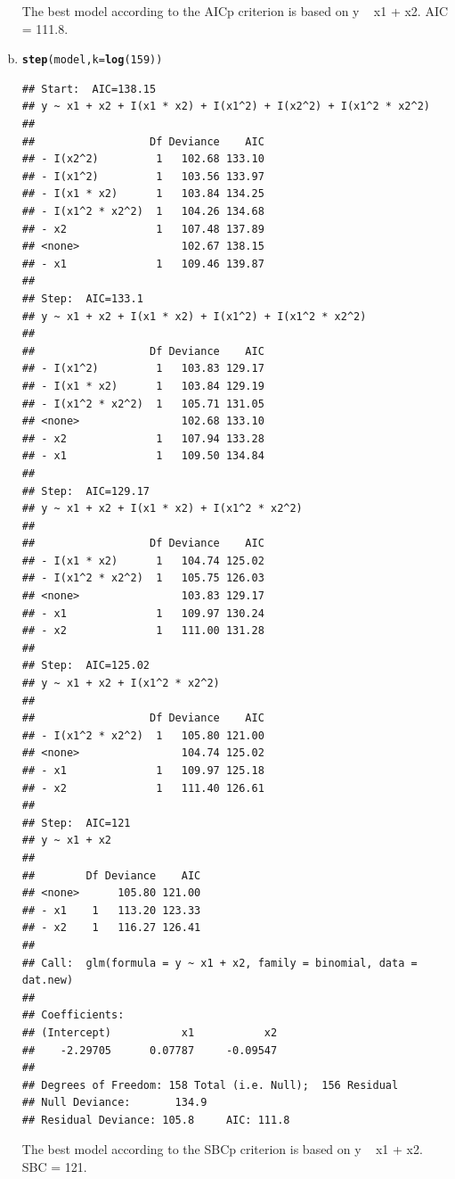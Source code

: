 \documentclass{article}\usepackage[]{graphicx}\usepackage[]{color}
\makeatletter
\newcommand{\hlnum}[1]{\textcolor[rgb]{0.686,0.059,0.569}{#1}}%
\newcommand{\hlstd}[1]{\textcolor[rgb]{0.345,0.345,0.345}{#1}}%
\newcommand{\hlkwc}[1]{\textcolor[rgb]{0.333,0.667,0.333}{#1}}%
\newcommand{\hlkwd}[1]{\textcolor[rgb]{0.737,0.353,0.396}{\textbf{#1}}}%
\newenvironment{kframe}{%
 \def\at@end@of@kframe{}%
 \ifinner\ifhmode%
  \def\at@end@of@kframe{\end{minipage}}%
  \begin{minipage}{\columnwidth}%
 \fi\fi%
 \def\FrameCommand##1{\hskip\@totalleftmargin \hskip-\fboxsep
 \colorbox{shadecolor}{##1}\hskip-\fboxsep
     \hskip-\linewidth \hskip-\@totalleftmargin \hskip\columnwidth}%
 \MakeFramed {\advance\hsize-\width
   \@totalleftmargin\z@ \linewidth\hsize
   \@setminipage}}%
 {\par\unskip\endMakeFramed%
 \at@end@of@kframe}
\newenvironment{knitrout}{}{} %
\makeatother
\begin{document}
\begin{enumerate}[(a)]
\qquad The best model according to the AICp criterion is based on y ~ x1 + x2. AIC = 111.8.

\item

\begin{knitrout}
\color{fgcolor}\begin{kframe}
\begin{alltt}
  \hlkwd{step}\hlstd{(model,} \hlkwc{k} \hlstd{=} \hlkwd{log}\hlstd{(}\hlnum{159}\hlstd{))}
\end{alltt}
\begin{verbatim}
## Start:  AIC=138.15
## y ~ x1 + x2 + I(x1 * x2) + I(x1^2) + I(x2^2) + I(x1^2 * x2^2)
## 
##                  Df Deviance    AIC
## - I(x2^2)         1   102.68 133.10
## - I(x1^2)         1   103.56 133.97
## - I(x1 * x2)      1   103.84 134.25
## - I(x1^2 * x2^2)  1   104.26 134.68
## - x2              1   107.48 137.89
## <none>                102.67 138.15
## - x1              1   109.46 139.87
## 
## Step:  AIC=133.1
## y ~ x1 + x2 + I(x1 * x2) + I(x1^2) + I(x1^2 * x2^2)
## 
##                  Df Deviance    AIC
## - I(x1^2)         1   103.83 129.17
## - I(x1 * x2)      1   103.84 129.19
## - I(x1^2 * x2^2)  1   105.71 131.05
## <none>                102.68 133.10
## - x2              1   107.94 133.28
## - x1              1   109.50 134.84
## 
## Step:  AIC=129.17
## y ~ x1 + x2 + I(x1 * x2) + I(x1^2 * x2^2)
## 
##                  Df Deviance    AIC
## - I(x1 * x2)      1   104.74 125.02
## - I(x1^2 * x2^2)  1   105.75 126.03
## <none>                103.83 129.17
## - x1              1   109.97 130.24
## - x2              1   111.00 131.28
## 
## Step:  AIC=125.02
## y ~ x1 + x2 + I(x1^2 * x2^2)
## 
##                  Df Deviance    AIC
## - I(x1^2 * x2^2)  1   105.80 121.00
## <none>                104.74 125.02
## - x1              1   109.97 125.18
## - x2              1   111.40 126.61
## 
## Step:  AIC=121
## y ~ x1 + x2
## 
##        Df Deviance    AIC
## <none>      105.80 121.00
## - x1    1   113.20 123.33
## - x2    1   116.27 126.41
## 
## Call:  glm(formula = y ~ x1 + x2, family = binomial, data = dat.new)
## 
## Coefficients:
## (Intercept)           x1           x2  
##    -2.29705      0.07787     -0.09547  
## 
## Degrees of Freedom: 158 Total (i.e. Null);  156 Residual
## Null Deviance:	    134.9 
## Residual Deviance: 105.8 	AIC: 111.8
\end{verbatim}
\end{kframe}
\end{knitrout}

\qquad The best model according to the SBCp criterion is based on y ~ x1 + x2. SBC = 121.

\end{enumerate}
\end{document}
